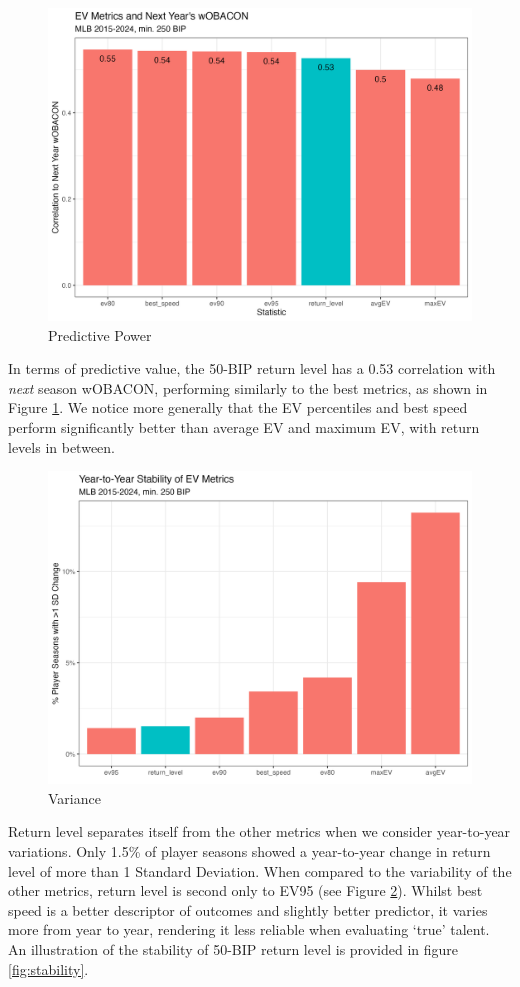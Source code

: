 \documentclass[12pt, TexShade, letterpaper]{report}
\begin{document}
\begin{figure}[ht]
    \centering
    \includegraphics[width=0.85\linewidth]{plots/woba_next_correlation.png}
    \caption{Predictive Power}
    \label{fig:corr-future}
\end{figure}

In terms of predictive value, the 50-BIP return level has a 0.53 correlation with \textit{next} season wOBACON, performing similarly to the best metrics, as shown in Figure \ref{fig:corr-future}. We notice more generally that the EV percentiles and best speed perform significantly better than average EV and maximum EV, with return levels in between.

\begin{figure}[ht]
    \centering
    \includegraphics[width=0.7\linewidth]{plots/stability.png}
    \caption{Variance}
    \label{fig:variance}
\end{figure}

Return level separates itself from the other metrics when we consider year-to-year variations. Only 1.5\% of player seasons showed a year-to-year change in return level of more than 1 Standard Deviation. When compared to the variability of the other metrics, return level is second only to EV95 (see Figure \ref{fig:variance}). Whilst best speed is a better descriptor of outcomes and slightly better predictor, it varies more from year to year, rendering it less reliable when evaluating `true' talent. An illustration of the stability of 50-BIP return level is provided in figure \ref{fig:stability}.
\end{document}
